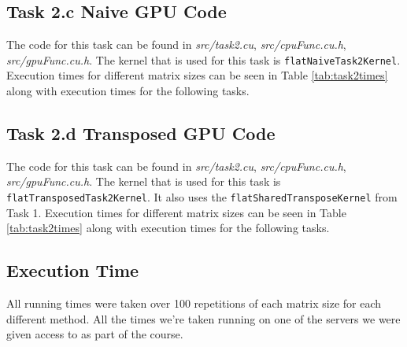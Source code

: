\subsection{Task 2.c Naive GPU Code}
The code for this task can be found in \textit{src/task2.cu},
\textit{src/cpuFunc.cu.h}, \textit{src/gpuFunc.cu.h}. The kernel that is used
for this task is \texttt{flatNaiveTask2Kernel}. Execution times for different
matrix sizes can be seen in Table \ref{tab:task2times} along with execution
times for the following tasks.


\subsection{Task 2.d Transposed GPU Code}
The code for this task can be found in \textit{src/task2.cu},
\textit{src/cpuFunc.cu.h}, \textit{src/gpuFunc.cu.h}. The kernel that is used
for this task is \texttt{flatTransposedTask2Kernel}. It also uses the
\texttt{flatSharedTransposeKernel} from Task 1. Execution times for different
matrix sizes can be seen in Table \ref{tab:task2times} along with execution
times for the following tasks.



\subsection{Execution Time}
All running times were taken over 100 repetitions of each matrix size for each
different method. All the times we're taken running on one of the servers we
were given access to as part of the course.


